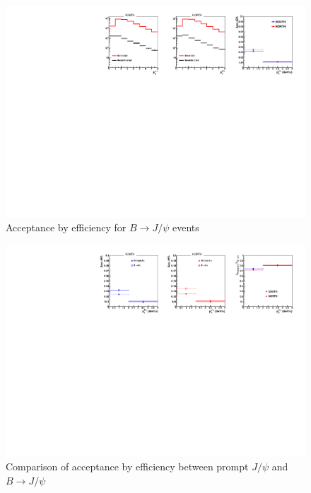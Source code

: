 \documentclass[12pt]{article}
\newcommand{\jpsi}{$J/\psi$ }
\newcommand{\bjpsi}{${B} \to J/\psi$ }
\begin{document}
\begin{figure}[!htb]
	\includegraphics[width=1.0\textwidth]{Figures/Run12pp510_BJpsi_acc_eff}
	\caption{Acceptance by efficiency for \bjpsi events}
	\label{fig:BJpsi_acceff}
\end{figure}

\begin{figure}[!htb]
	\includegraphics[width=1.0\textwidth]{Figures/Run12pp510_acc_eff_comparison}
	\caption{Comparison of acceptance by efficiency between prompt \jpsi and \bjpsi}
	\label{fig:acceff_comparison}
\end{figure}
\end{document}
